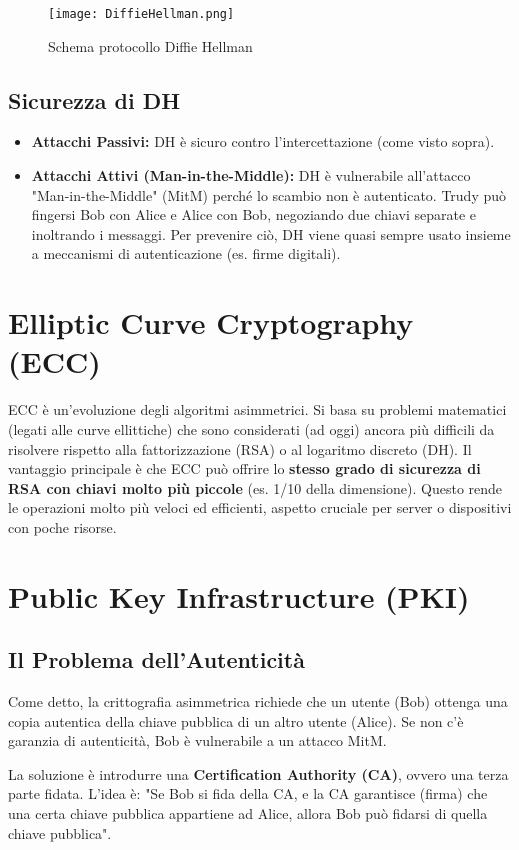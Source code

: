 \documentclass[../main.tex]{subfiles}
\begin{document}
\begin{figure}[H]
  \centering
  \texttt{[image: DiffieHellman.png]}
  \caption{Schema protocollo Diffie Hellman}
  \label{fig:}
\end{figure}
\subsection{Sicurezza di DH}
\begin{itemize}
    \item \textbf{Attacchi Passivi:} DH è sicuro contro l'intercettazione (come visto sopra).
    \item \textbf{Attacchi Attivi (Man-in-the-Middle):} DH è vulnerabile all'attacco "Man-in-the-Middle" (MitM) perché lo scambio non è autenticato. Trudy può fingersi Bob con Alice e Alice con Bob, negoziando due chiavi separate e inoltrando i messaggi. Per prevenire ciò, DH viene quasi sempre usato insieme a meccanismi di autenticazione (es. firme digitali).
\end{itemize}

\section{Elliptic Curve Cryptography (ECC)}
ECC è un'evoluzione degli algoritmi asimmetrici. Si basa su problemi matematici (legati alle curve ellittiche) che sono considerati (ad oggi) ancora più difficili da risolvere rispetto alla fattorizzazione (RSA) o al logaritmo discreto (DH).
Il vantaggio principale è che ECC può offrire lo \textbf{stesso grado di sicurezza di RSA con chiavi molto più piccole} (es. 1/10 della dimensione). Questo rende le operazioni molto più veloci ed efficienti, aspetto cruciale per server o dispositivi con poche risorse.

\section{Public Key Infrastructure (PKI)}
\subsection{Il Problema dell'Autenticità}
Come detto, la crittografia asimmetrica richiede che un utente (Bob) ottenga una copia autentica della chiave pubblica di un altro utente (Alice). Se non c'è garanzia di autenticità, Bob è vulnerabile a un attacco MitM.

La soluzione è introdurre una \textbf{Certification Authority (CA)}, ovvero una terza parte fidata.
L'idea è: "Se Bob si fida della CA, e la CA garantisce (firma) che una certa chiave pubblica appartiene ad Alice, allora Bob può fidarsi di quella chiave pubblica".
\end{document}
